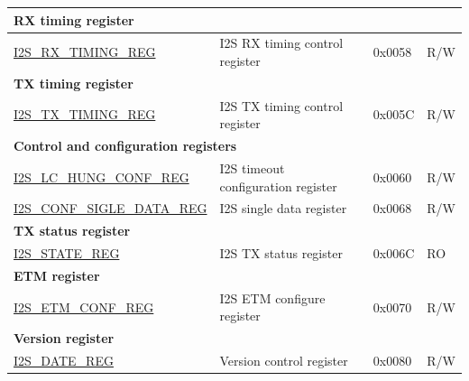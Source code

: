 \begin{longtable}{ | p{5cm} | p{7.2cm} | p{1.3cm} | p{2cm} | }
\multicolumn{4}{|l|}{\textbf{RX timing register}} \\ \hline
\hyperref[regdesc:I2SRXTIMINGREG]{I2S\_RX\_TIMING\_REG} & I2S RX timing control register & 0x0058 & R/W \\ \hline
\multicolumn{4}{|l|}{\textbf{TX timing register}} \\ \hline
\hyperref[regdesc:I2STXTIMINGREG]{I2S\_TX\_TIMING\_REG} & I2S TX timing control register & 0x005C & R/W \\ \hline
\multicolumn{4}{|l|}{\textbf{Control and configuration registers}} \\ \hline
\hyperref[regdesc:I2SLCHUNGCONFREG]{I2S\_LC\_HUNG\_CONF\_REG} & I2S timeout configuration register & 0x0060 & R/W \\ \hline
\hyperref[regdesc:I2SCONFSIGLEDATAREG]{I2S\_CONF\_SIGLE\_DATA\_REG} & I2S single data register & 0x0068 & R/W \\ \hline
\multicolumn{4}{|l|}{\textbf{TX status register}} \\ \hline
\hyperref[regdesc:I2SSTATEREG]{I2S\_STATE\_REG} & I2S TX status register & 0x006C & RO \\ \hline
\multicolumn{4}{|l|}{\textbf{ETM register}} \\ \hline
\hyperref[regdesc:I2SETMCONFREG]{I2S\_ETM\_CONF\_REG} & I2S ETM configure register & 0x0070 & R/W \\ \hline
\multicolumn{4}{|l|}{\textbf{Version register}} \\ \hline
\hyperref[regdesc:I2SDATEREG]{I2S\_DATE\_REG} & Version control register & 0x0080 & R/W \\ \hline
\end{longtable}
